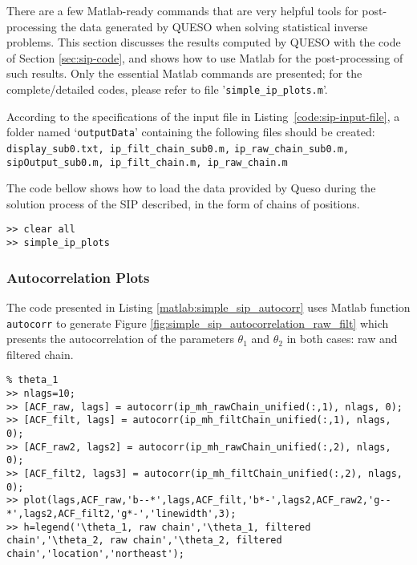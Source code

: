 There are a few Matlab-ready commands that are very helpful tools for post-processing the data generated by QUESO when solving statistical inverse problems. This section discusses the results computed by QUESO with the code of Section \ref{sec:sip-code}, and shows how to use Matlab for the post-processing of such results. Only the essential Matlab commands are presented; for the complete/detailed codes, please refer to file '\verb+simple_ip_plots.m+'.

According to the specifications of the input file in Listing~\ref{code:sip-input-file}, a folder named `\verb+outputData+' containing the following files should be created: \verb+display_sub0.txt, ip_filt_chain_sub0.m,+ \verb+ip_raw_chain_sub0.m, sipOutput_sub0.m, ip_filt_chain.m, ip_raw_chain.m+


The code bellow shows how to load the data provided by Queso during the solution process of the SIP described, in the form of 
chains of positions.

\begin{lstlisting}[caption={Matlab code for loading the data in both raw and filtered chains of the SIP, by calling the file \texttt{simple\_ip\_plots.m}.}]
% inside Matlab
>> clear all
>> simple_ip_plots
\end{lstlisting}


\subsubsection{Autocorrelation Plots}

The code presented in Listing \ref{matlab:simple_sip_autocorr} uses Matlab function \verb+autocorr+ to generate Figure \ref{fig:simple_sip_autocorrelation_raw_filt}
which presents the autocorrelation of the parameters $\theta_1$ and $\theta_2$ in both cases: raw and filtered chain. 

\begin{lstlisting}[label=matlab:simple_sip_autocorr,caption={Matlab code for the autocorrelation plots depicted in Figure \ref{fig:simple_sip_autocorrelation_raw_filt}.}]
% inside Matlab
% theta_1
>> nlags=10;
>> [ACF_raw, lags] = autocorr(ip_mh_rawChain_unified(:,1), nlags, 0);
>> [ACF_filt, lags] = autocorr(ip_mh_filtChain_unified(:,1), nlags, 0);
>> [ACF_raw2, lags2] = autocorr(ip_mh_rawChain_unified(:,2), nlags, 0);
>> [ACF_filt2, lags3] = autocorr(ip_mh_filtChain_unified(:,2), nlags, 0);
>> plot(lags,ACF_raw,'b--*',lags,ACF_filt,'b*-',lags2,ACF_raw2,'g--*',lags2,ACF_filt2,'g*-','linewidth',3);
>> h=legend('\theta_1, raw chain','\theta_1, filtered chain','\theta_2, raw chain','\theta_2, filtered chain','location','northeast');
\end{lstlisting}


